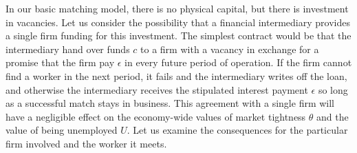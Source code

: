 In our basic matching model, there is no physical capital, but
there is investment in vacancies. Let us consider the possibility
that a financial intermediary provides a single firm funding for this
investment. The simplest contract would
be that the intermediary hand over funds $c$ to a firm with a
vacancy in exchange for a promise that the firm pay
$\epsilon$ in every future period of operation. If the firm cannot
find a worker in the next period, it fails and the intermediary
writes off the loan, and otherwise the intermediary receives the
stipulated interest payment $\epsilon$ so long as a successful
match stays in business. This agreement with a single firm will
have a negligible effect on the economy-wide values of market
tightness $\theta$ and
the value of being unemployed $U$. Let us examine the consequences
for the particular firm involved and the worker it meets.

